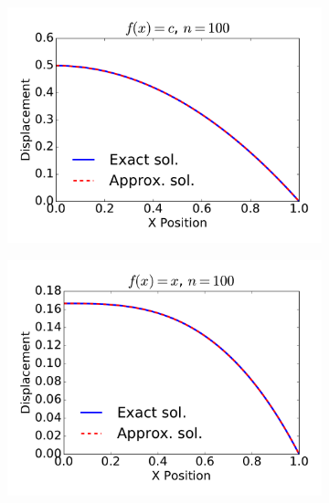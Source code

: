 \documentclass{article}
\begin{document}
\begin{figure}
        \begin{subfigure}[b]{0.33\textwidth}
                \includegraphics[width=\linewidth]{displacement_func0_Nell100}
                \label{fig:gull}
        \end{subfigure}%
        \begin{subfigure}[b]{0.33\textwidth}
                \includegraphics[width=\linewidth]{displacement_func1_Nell100}
                \label{fig:gull2}
        \end{subfigure}%
        \begin{subfigure}[b]{0.33\textwidth}

\end{subfigure}
\end{figure}
\end{document}
